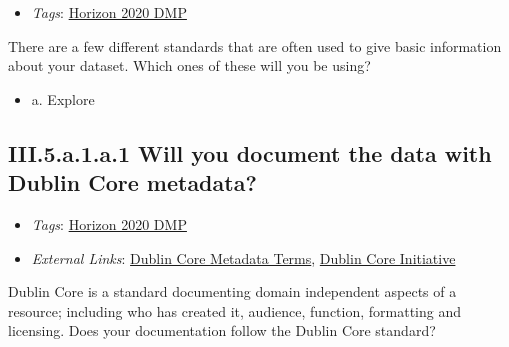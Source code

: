 \documentclass[a4paper,12pt]{report}
\begin{document}
\begin{itemize}
  \item \textit{Tags}: \ul{Horizon 2020 DMP}
  \end{itemize}


\noindent
\begin{markdown}
There are a few different standards that are often used to give basic information about your dataset. Which ones of these will you be using?
\end{markdown}



\begin{itemize}
  \item[\CheckmarkBold] a. Explore
\end{itemize}




\subsection*{\protect\textcolor{colorSecId}{III.5.a.1.a.1} Will you document the data with Dublin Core metadata? }

\label{b1df3c74-0b1f-4574-81c4-4cc2d780c1af.8c962e6f-17ee-4b22-8ebb-9f06f779e3b3.6d18bfff-0f53-469b-934e-9806dda9d4fb.1440afd6-d516-44f6-9c02-6abb13900b66.aec37b0d-490d-4d75-8814-8ed78ea5b8dd.8d3b85e0-1683-48a5-a650-9f0d9bf8a1a4}


\begin{itemize}
  \item \textit{Tags}: \ul{Horizon 2020 DMP}
  
  \item \textit{External Links}: \href{https://www.dublincore.org/specifications/dublin-core/dcmi-terms/}{Dublin Core Metadata Terms}, \href{https://www.dublincore.org}{Dublin Core Initiative}\end{itemize}


\noindent
\begin{markdown}
Dublin Core is a standard documenting domain independent aspects of a resource; including who has created it, audience, function, formatting and licensing. Does your documentation follow the Dublin Core standard? 
\end{markdown}
\end{document}
